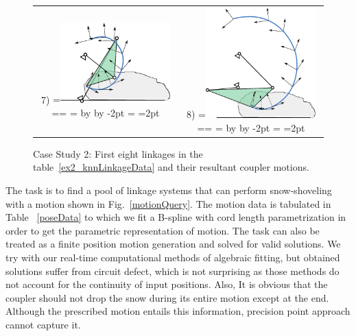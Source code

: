 \documentclass[twocolumn,10pt]{asme2ej}
\makeatletter
\newcommand{\putindeepbox}[2][0.7\baselineskip]{{%
    \setbox0=\hbox{#2}%
    \setbox0=\vbox{\noindent\hsize=\wd0\unhbox0}
    \@tempdima=\dp0
    \advance\@tempdima by \ht0
    \advance\@tempdima by -#1\relax
    \dp0=\@tempdima
    \ht0=#1\relax
    \box0
}}
\makeatother
\begin{document}
\begin{figure}
\begin{tabular}{cc}
  7)\putindeepbox[2pt]{\includegraphics[width=120pt]{figure/sol8.eps}}
    & 8)\putindeepbox[2pt]{\includegraphics[width=120pt]{figure/sol9.eps}}\\
\end{tabular}
\caption{Case Study 2: First eight linkages in the table~\ref{ex2_knnLinkageData} and their resultant coupler motions.}
\label{ex2_solns}
\end{figure}

The task is to find a pool of linkage systems that can perform snow-shoveling with a motion shown in Fig.~\ref{motionQuery}.
The motion data is tabulated in Table ~\ref{poseData} to which we fit a B-spline with cord length parametrization in order to get the parametric representation of motion.
The task can also be treated as a finite position motion generation and solved for valid solutions.
We try with our real-time computational methods of algebraic fitting\cite{generalfitting-JCISE},\cite{shrinathpurwar2017} but obtained solutions suffer from circuit defect, which is not surprising as those methods do not account for the continuity of input positions.
Also, It is obvious that the coupler should not drop the snow during its entire motion except at the end.
Although the prescribed motion entails this information, precision point approach cannot capture it.
\end{document}
